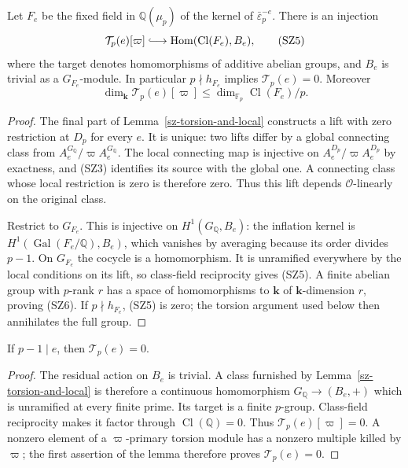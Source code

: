 \begin{proposition}\label{sz-residual-class}
Let $F_e$ be the fixed field in $\mathbb Q(\mu_p)$ of the
kernel of $\bar\varepsilon_p^{-e}$. There is an injection
\[
       \mathcal T_p(e)[\varpi]\lhook\joinrel\longrightarrow
                  \operatorname{Hom}(\operatorname{Cl}(F_e),B_e),
                                                               \tag{SZ5}
\]
where the target denotes homomorphisms of additive abelian
groups, and $B_e$ is trivial as a $G_{F_e}$-module.
In particular $p\nmid h_{F_e}$ implies $\mathcal T_p(e)=0$.
Moreover
\[
 \dim_{\mathbf k}\mathcal T_p(e)[\varpi]
       \le\dim_{\mathbb F_p}\operatorname{Cl}(F_e)/p.
                                                               \tag{SZ6}
\]
\end{proposition}
\begin{proof}
The final part of Lemma~\ref{sz-torsion-and-local} constructs
a lift with zero restriction at $D_p$ for every $e$.
It is unique: two lifts differ by a global connecting class
from $A_e^{G_{\mathbb Q}}/\varpi A_e^{G_{\mathbb Q}}$.
The local connecting map is injective on
$A_e^{D_p}/\varpi A_e^{D_p}$ by exactness, and (SZ3)
identifies its source with the global one. A connecting
class whose local restriction is zero is therefore zero.
Thus this lift depends $\mathcal O$-linearly on the original
class.

Restrict to $G_{F_e}$. This is injective on
$H^1(G_{\mathbb Q},B_e)$: the inflation kernel is
$H^1(\operatorname{Gal}(F_e/\mathbb Q),B_e)$, which
vanishes by averaging because its order divides $p-1$.
On $G_{F_e}$ the cocycle is a homomorphism. It is
unramified everywhere by the local conditions on its lift,
so class-field reciprocity gives (SZ5). A finite abelian
group with $p$-rank $r$ has a space of homomorphisms to
$\mathbf k$ of $\mathbf k$-dimension $r$, proving (SZ6).
If $p\nmid h_{F_e}$, (SZ5) is zero; the torsion argument
used below then annihilates the full group.
\end{proof}

\begin{theorem}\label{sz-trivial}
If $p-1\mid e$, then $\mathcal T_p(e)=0$.
\end{theorem}
\begin{proof}
The residual action on $B_e$ is trivial. A class furnished
by Lemma~\ref{sz-torsion-and-local} is therefore a continuous
homomorphism $G_{\mathbb Q}\to(B_e,+)$ which is unramified
at every finite prime. Its target is a finite $p$-group.
Class-field reciprocity makes it factor through
$\operatorname{Cl}(\mathbb Q)=0$. Thus
$\mathcal T_p(e)[\varpi]=0$. A nonzero element of a
$\varpi$-primary torsion module has a nonzero multiple
killed by $\varpi$; the first assertion of the lemma
therefore proves $\mathcal T_p(e)=0$.
\end{proof}

